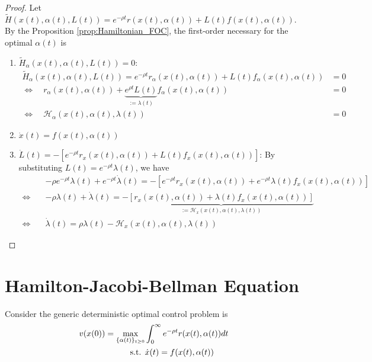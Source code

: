 \documentclass[11pt]{elegantbook}
\begin{document}
\begin{proof}
    Let $\tilde{H}(x(t),\alpha(t),L(t))=e^{-\rho t}r(x(t),\alpha(t))+L(t)f(x(t),\alpha(t))$. By the Proposition \ref{prop:Hamiltonian_FOC}, the first-order necessary for the optimal $\alpha(t)$ is
    \begin{enumerate}
        \item $\tilde{H}_\alpha(x(t),\alpha(t),L(t))=0$:
        \begin{equation}
            \begin{aligned}
                \tilde{H}_\alpha(x(t),\alpha(t),L(t))=e^{-\rho t}r_\alpha(x(t),\alpha(t))+L(t)f_\alpha(x(t),\alpha(t))&=0\\
                \Leftrightarrow\quad r_\alpha(x(t),\alpha(t))+\underbrace{e^{\rho t}L(t)}_{:=\lambda(t)}f_\alpha(x(t),\alpha(t))&=0\\
                \Leftrightarrow\quad \mathcal{H}_\alpha(x(t),\alpha(t),\lambda(t))&=0
            \end{aligned}
            \nonumber
        \end{equation}
        \item $\dot{x}(t)=f(x(t),\alpha(t))$
        \item $\dot{L}(t)=-[e^{-\rho t}r_x(x(t),\alpha(t))+L(t)f_x(x(t),\alpha(t))]$: By substituting $L(t)=e^{-\rho t}\lambda(t)$, we have
        \begin{equation}
            \begin{aligned}
                &-\rho e^{-\rho t}\lambda(t) + e^{-\rho t}\dot{\lambda}(t)=-[e^{-\rho t}r_x(x(t),\alpha(t))+e^{-\rho t}\lambda(t)f_x(x(t),\alpha(t))]\\
                \Leftrightarrow\quad&-\rho\lambda(t) + \dot{\lambda}(t)=-\underbrace{[r_x(x(t),\alpha(t))+\lambda(t)f_x(x(t),\alpha(t))]}_{:=\mathcal{H}_x(x(t),\alpha(t),\lambda(t))}\\
                \Leftrightarrow\quad&\dot{\lambda}(t)=\rho\lambda(t)-\mathcal{H}_x(x(t),\alpha(t),\lambda(t))
            \end{aligned}
            \nonumber
        \end{equation}
    \end{enumerate}
\end{proof}

\section{Hamilton-Jacobi-Bellman Equation}
Consider the generic deterministic optimal control problem is
\begin{equation}
    \begin{aligned}
        v(x(0))=\max_{\{\alpha(t)\}_{t\geq 0}}&\int_0^\infty e^{-\rho t}r(x(t),\alpha(t))dt\\
        \textnormal{s.t. }&\dot{x}(t)=f(x(t),\alpha(t))
    \end{aligned}
    \nonumber
\end{equation}
\end{document}
